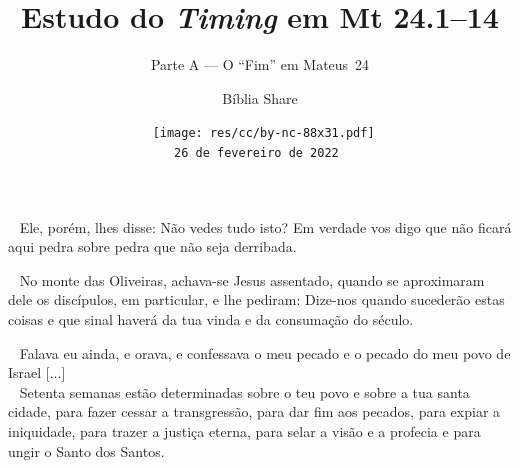 \documentclass[12pt,aspectratio=169]{beamer}
\title{Estudo do \textit{Timing} em Mt 24.1--14}
\subtitle{Parte A --- O ``Fim'' em Mateus~24}
\author{Bíblia Share}
\date[{\tiny\tt{26 de fevereiro de 2022}}]{{\scriptsize\tt%
    \texttt{[image: res/cc/by-nc-88x31.pdf]}\\[\smallskipamount]
    26 de fevereiro de 2022%
}}
\newcommand{\ver}[1]{%
    \raisebox{0.50ex}{%
        \scalebox{1.1}{%
            \pmb{\textbf{\textcolor{BSpbg}{#1}}}%
        }%
    }%
}
\newcommand{\QUOTE}[1]{%
    \par\noindent\hspace*{0.1\linewidth}%
    \begin{minipage}{0.8\linewidth}%
        \linespread{1.35}\large{#1}%
    \end{minipage}%
}
\newcommand{\ORA}[1]{{\textcolor{TXora}{#1}}}
\newcommand{\YEL}[1]{{\textcolor{TXyel}{#1}}}
\newcommand{\GRE}[1]{{\textcolor{TXgre}{#1}}}
\newcommand{\MAG}[1]{{\textcolor{TXmag}{#1}}}
\newcommand{\BRI}[1]{{\textcolor{BSpbg}{#1}}}   %
\begin{document}
\begin{frame}
    \titlepage
\end{frame}

    \begin{frame}
        \QUOTE{%
            \ver{(ARA) Mt~24.2}~%
            Ele, porém, lhes disse: \YEL{Não vedes tudo  isto?}  Em  verdade  vos  digo  que
            \YEL{não ficará aqui pedra sobre pedra que não seja derribada.}
        }
    \end{frame}

    \begin{frame}
        \QUOTE{%
            \ver{(ARA) Mt~24.3}~%
            No monte das Oliveiras, achava-se Jesus assentado, quando se aproximaram dele os
            discípulos, \BRI{em particular}, e lhe pediram: Dize-nos  \YEL{quando  sucederão
            estas coisas} e \GRE{que sinal haverá da tua  vinda}  e  da  \MAG{consumação  do
            século}.
        }
    \end{frame}

    \begin{frame}
        \QUOTE{%
            \ver{(ARA) Dn~9.20a}~%
            Falava eu ainda, e orava, e confessava o meu pecado e o pecado do \YEL{meu  povo
            de Israel} [...] \\[\bigskipamount]
            \ver{(ARA) Dn~9.24}~%
            \GRE{Setenta semanas} estão \MAG{determinadas} sobre \YEL{o teu  povo}  e  sobre
            \ORA{a tua santa cidade}, para fazer cessar a transgressão,  para  dar  fim  aos
            pecados, para \BRI{expiar a iniquidade}, para  \BRI{trazer  a  justiça  eterna},
            para selar a visão e a profecia e para ungir o Santo dos Santos.
        }
    \end{frame}
\end{document}
